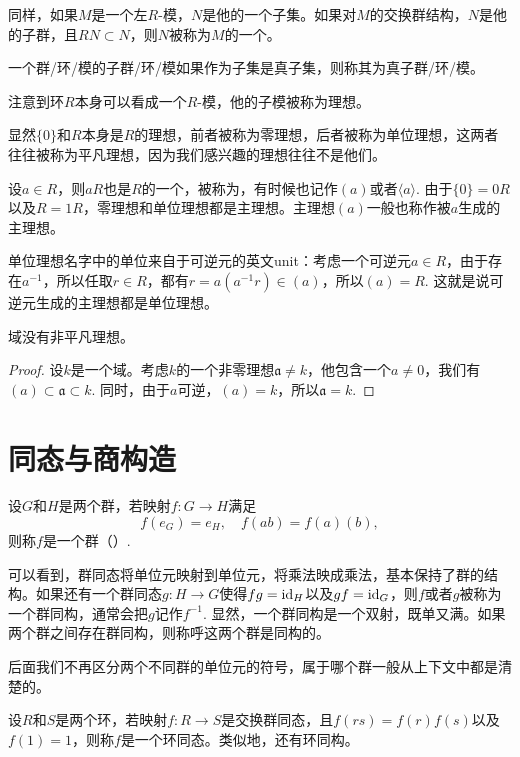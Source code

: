 同样，如果$M$是一个左$R$-模，$N$是他的一个子集。如果对$M$的交换群结构，$N$是他的子群，且$RN\subset N$，则$N$被称为$M$的一个。

一个群/环/模的子群/环/模如果作为子集是真子集，则称其为真子群/环/模。

\begin{para}[理想]
注意到环$R$本身可以看成一个$R$-模，他的子模被称为理想。
\end{para}

显然$\{0\}$和$R$本身是$R$的理想，前者被称为零理想，后者被称为单位理想，这两者往往被称为平凡理想，因为我们感兴趣的理想往往不是他们。

设$a\in R$，则$aR$也是$R$的一个，被称为，有时候也记作$(a)$或者$\langle a\rangle$. 由于$\{0\}=0R$以及$R=1R$，零理想和单位理想都是主理想。主理想$(a)$一般也称作被$a$生成的主理想。

单位理想名字中的单位来自于可逆元的英文unit：考虑一个可逆元$a\in R$，由于存在$a^{-1}$，所以任取$r\in R$，都有$r=a(a^{-1}r)\in (a)$，所以$(a)=R$. 这就是说可逆元生成的主理想都是单位理想。

\begin{pro}
	域没有非平凡理想。
\end{pro}

\begin{proof}
	设$k$是一个域。考虑$k$的一个非零理想$\mathfrak{a}\neq k$，他包含一个$a\neq 0$，我们有$(a)\subset \mathfrak{a} \subset k$. 同时，由于$a$可逆，$(a)=k$，所以$\mathfrak{a}=k$.
\end{proof}

\section{同态与商构造}

\begin{para}[群同态]
设$G$和$H$是两个群，若映射$f:G\to H$满足
\[
	f(e_G)=e_H,\quad f(ab)=f(a)(b),
\]
则称$f$是一个群（）.
\end{para}

可以看到，群同态将单位元映射到单位元，将乘法映成乘法，基本保持了群的结构。如果还有一个群同态$g:H\to G$使得$fg=\operatorname{id}_H$以及$gf=\operatorname{id}_G$，则$f$或者$g$被称为一个群同构，通常会把$g$记作$f^{-1}$. 显然，一个群同构是一个双射，既单又满。如果两个群之间存在群同构，则称呼这两个群是同构的。

后面我们不再区分两个不同群的单位元的符号，属于哪个群一般从上下文中都是清楚的。

\para[环、模同态] 设$R$和$S$是两个环，若映射$f:R\to S$是交换群同态，且$f(rs)=f(r)f(s)$以及$f(1)=1$，则称$f$是一个环同态。类似地，还有环同构。

